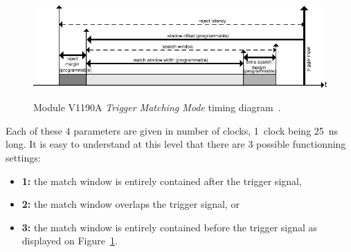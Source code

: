     \begin{figure}[H]
		\centering
		\includegraphics[width = 1.25\plotwidth]{fig/app1/V1190A-TMM.pdf}\\
		\caption{\label{fig:V1190A-TMM} Module V1190A \textit{Trigger Matching Mode} timing diagram~\cite{V1190AMUT}.}
	\end{figure}
	
	Each of these 4 parameters are given in number of clocks, \SI{1}{clock} being \SI{25}{ns} long. It is easy to understand at this level that there are 3 possible functionning settings:
        
	\begin{itemize}
		\item \textbf{1:} the match window is entirely contained after the trigger signal,
		\item \textbf{2:} the match window overlaps the trigger signal, or
		\item \textbf{3:} the match window is entirely contained before the trigger signal as displayed on Figure~\ref{fig:V1190A-TMM}.
	\end{itemize}
	
